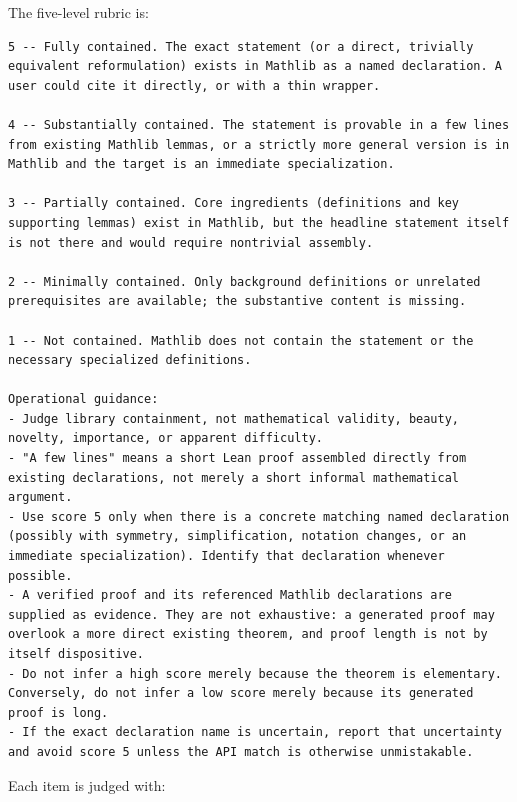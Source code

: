 \label{app:containment-prompt}

The five-level rubric is:

\begin{lstlisting}[basicstyle=\ttfamily\scriptsize,frame=single,breaklines=true]
5 -- Fully contained. The exact statement (or a direct, trivially equivalent reformulation) exists in Mathlib as a named declaration. A user could cite it directly, or with a thin wrapper.

4 -- Substantially contained. The statement is provable in a few lines from existing Mathlib lemmas, or a strictly more general version is in Mathlib and the target is an immediate specialization.

3 -- Partially contained. Core ingredients (definitions and key supporting lemmas) exist in Mathlib, but the headline statement itself is not there and would require nontrivial assembly.

2 -- Minimally contained. Only background definitions or unrelated prerequisites are available; the substantive content is missing.

1 -- Not contained. Mathlib does not contain the statement or the necessary specialized definitions.

Operational guidance:
- Judge library containment, not mathematical validity, beauty, novelty, importance, or apparent difficulty.
- "A few lines" means a short Lean proof assembled directly from existing declarations, not merely a short informal mathematical argument.
- Use score 5 only when there is a concrete matching named declaration (possibly with symmetry, simplification, notation changes, or an immediate specialization). Identify that declaration whenever possible.
- A verified proof and its referenced Mathlib declarations are supplied as evidence. They are not exhaustive: a generated proof may overlook a more direct existing theorem, and proof length is not by itself dispositive.
- Do not infer a high score merely because the theorem is elementary. Conversely, do not infer a low score merely because its generated proof is long.
- If the exact declaration name is uncertain, report that uncertainty and avoid score 5 unless the API match is otherwise unmistakable.
\end{lstlisting}

Each item is judged with:

